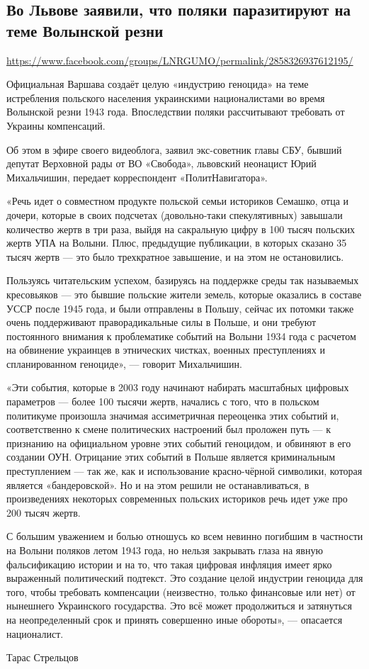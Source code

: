  
 
  
\subsection{Во Львове заявили, что поляки паразитируют на теме Волынской резни}
\label{sec:19_07_2020.fb.lnr.13}
\url{https://www.facebook.com/groups/LNRGUMO/permalink/2858326937612195/}

Официальная Варшава создаёт целую «индустрию геноцида» на теме истребления
польского населения украинскими националистами во время Волынской резни 1943
года. Впоследствии поляки рассчитывают требовать от Украины компенсаций.

Об этом в эфире своего видеоблога, заявил экс-советник главы СБУ, бывший
депутат Верховной рады от ВО «Свобода», львовский неонацист Юрий Михальчишин,
передает корреспондент «ПолитНавигатора».

«Речь идет о совместном продукте польской семьи историков Семашко, отца и
дочери, которые в своих подсчетах (довольно-таки спекулятивных) завышали
количество жертв в три раза, выйдя на сакральную цифру в 100 тысяч польских
жертв УПА на Волыни. Плюс, предыдущие публикации, в которых сказано 35 тысяч
жертв --- это было трехкратное завышение, и на этом не остановились.

Пользуясь читательским успехом, базируясь на поддержке среды так называемых
кресовьяков --- это бывшие польские жители земель, которые оказались в составе
УССР после 1945 года, и были отправлены в Польшу, сейчас их потомки также очень
поддерживают праворадикальные силы в Польше, и они требуют постоянного внимания
к проблематике событий на Волыни 1934 года с расчетом на обвинение украинцев в
этнических чистках, военных преступлениях и спланированном геноциде», --- говорит
Михальчишин.

«Эти события, которые в 2003 году начинают набирать масштабных цифровых
параметров --- более 100 тысячи жертв, начались с того, что в польском политикуме
произошла значимая ассиметричная переоценка этих событий и, соответственно к
смене политических настроений был проложен путь --- к признанию на официальном
уровне этих событий геноцидом, и обвиняют в его создании ОУН. Отрицание этих
событий в Польше является криминальным преступлением --- так же, как и
использование красно-чёрной символики, которая является «бандеровской». Но и на
этом решили не останавливаться, в произведениях некоторых современных польских
историков речь идет уже про 200 тысяч жертв.

С большим уважением и болью отношусь ко всем невинно погибшим в частности на
Волыни поляков летом 1943 года, но нельзя закрывать глаза на явную
фальсификацию истории и на то, что такая цифровая инфляция имеет ярко
выраженный политический подтекст. Это создание целой индустрии геноцида для
того, чтобы требовать компенсации (неизвестно, только финансовые или нет) от
нынешнего Украинского государства. Это всё может продолжиться и затянуться на
неопределенный срок и принять совершенно иные обороты», --- опасается
националист.

Тарас Стрельцов 
